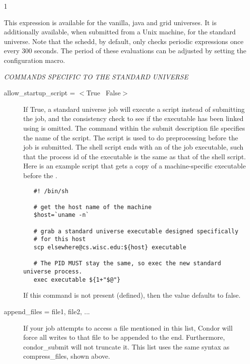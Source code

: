 \begin{ManPage}{\label{man-condor-submit}}{1}
\begin{description}
This expression is available for the vanilla, java and grid universes.
It is additionally available, when submitted from a Unix machine,
for the standard universe.  Note that the schedd, by default, only checks
periodic expressions once every 300 seconds.  The period of
these evaluations can be adjusted by setting the
 configuration macro.

\end{description} 



\emph{COMMANDS SPECIFIC TO THE STANDARD UNIVERSE}

\begin{description} 

\item[allow\_startup\_script = $<$True \Bar\ False$>$]
If True, a standard universe job will execute a script
instead of submitting the job,
and the consistency check to see if the executable has
been linked using  is omitted.
The  command within the submit description
file specifies the name of the script.
The script is used to do preprocessing before the
job is submitted.
The shell script ends with an  of the
job executable, such that the process id of the executable is the
same as that of the shell script.
Here is an example script that gets a copy of a machine-specific
executable before the .
\begin{verbatim} 
   #! /bin/sh

   # get the host name of the machine
   $host=`uname -n`

   # grab a standard universe executable designed specifically
   # for this host
   scp elsewhere@cs.wisc.edu:${host} executable

   # The PID MUST stay the same, so exec the new standard universe process.
   exec executable ${1+"$@"}
\end{verbatim} 
If this command is not present (defined), then the value
defaults to false.


\item[append\_files = file1, file2, ...]

If your job attempts to access a file mentioned in this list,
Condor will force all writes to that file to be appended to the end.
Furthermore, condor\_submit will not truncate it.
This list uses the same syntax as compress\_files, shown above.


\end{description}
\end{ManPage}
